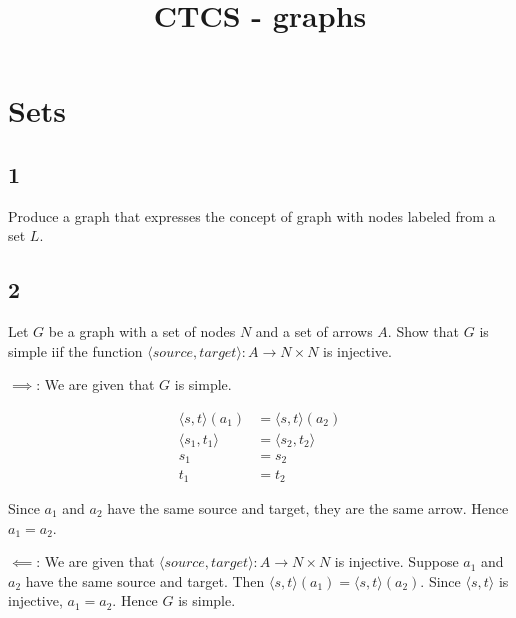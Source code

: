 \documentclass{article}
\title{CTCS - graphs}
\date{}
\newcommand{\<}{\langle}
\renewcommand{\>}{\rangle}
\begin{document}
\maketitle


\section*{Sets}


\subsection*{1}

Produce a graph that expresses the concept of graph with nodes labeled from a set $L$.


\subsection*{2}

Let $G$ be a graph with a set of nodes $N$ and a set of arrows $A$. Show that $G$ is simple iif the function $\<source, target\>: A \to N \times N$ is injective.

$\implies$: We are given that $G$ is simple.

\begin{align*}
\<s, t\>(a_1) &= \<s, t\>(a_2) \\
\<s_1, t_1\> &= \<s_2, t_2\> \\
s_1 &= s_2 \\
t_1 &= t_2
\end{align*}

Since $a_1$ and $a_2$ have the same source and target, they are the same arrow. Hence $a_1 = a_2$.

$\impliedby$: We are given that $\<source, target\>: A \to N \times N$ is injective. Suppose $a_1$ and $a_2$ have the same source and target. Then $\<s, t\>(a_1) = \<s, t\>(a_2)$. Since $\<s, t\>$ is injective, $a_1 = a_2$. Hence $G$ is simple.
\end{document}
